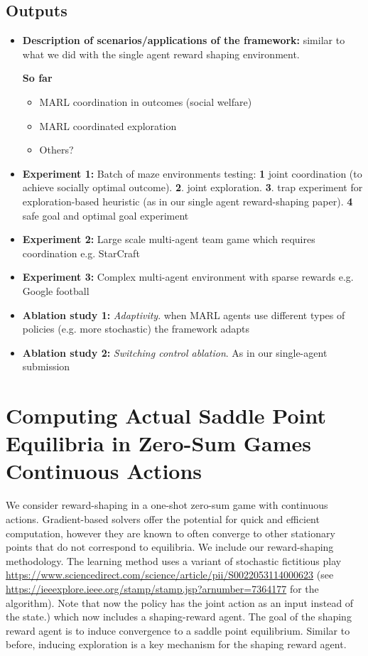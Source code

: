 \documentclass[12pt]{article}
\begin{document}
\subsection{Outputs}
\begin{itemize}
    \item \textbf{Description of scenarios/applications of the framework:} similar to what we did with the single agent reward shaping environment. 
    
        \textbf{So far}
    \begin{itemize}
        \item MARL coordination in outcomes (social welfare)
        \item MARL coordinated exploration
        \item Others?
    \end{itemize} 
\end{itemize}
\begin{itemize}
    \item \textbf{Experiment 1:}  Batch of maze environments testing: \textbf{1} joint coordination (to achieve socially optimal outcome). \textbf{2}. joint exploration. \textbf{3}. trap experiment for exploration-based heuristic (as in our single agent reward-shaping paper). \textbf{4} safe goal and optimal goal experiment
    \item \textbf{Experiment 2:} Large scale multi-agent team game which requires coordination e.g. StarCraft
    \item \textbf{Experiment 3:} Complex multi-agent environment with sparse rewards e.g. Google football
    \item \textbf{Ablation study 1:} \textit{Adaptivity}. when MARL agents use different types of policies (e.g. more stochastic) the framework adapts 
    \item \textbf{Ablation study 2:} \textit{Switching control ablation}. As in our single-agent submission
\end{itemize}

\section{Computing Actual Saddle Point Equilibria in Zero-Sum Games Continuous Actions}
We consider reward-shaping in a one-shot zero-sum game with continuous actions. Gradient-based solvers offer the potential for quick and efficient computation, however they are known to often converge to other stationary points that do not correspond to equilibria. We include our reward-shaping methodology. The learning method uses a variant of stochastic fictitious play \url{https://www.sciencedirect.com/science/article/pii/S0022053114000623} 
(see \url{https://ieeexplore.ieee.org/stamp/stamp.jsp?arnumber=7364177} for the algorithm).
Note that now the policy has the joint action as an input instead of the state.) which now includes a shaping-reward agent. The goal of the shaping reward agent is to induce convergence to a saddle point equilibrium. Similar to before, inducing exploration is a key mechanism for the shaping reward agent.
\end{document}
